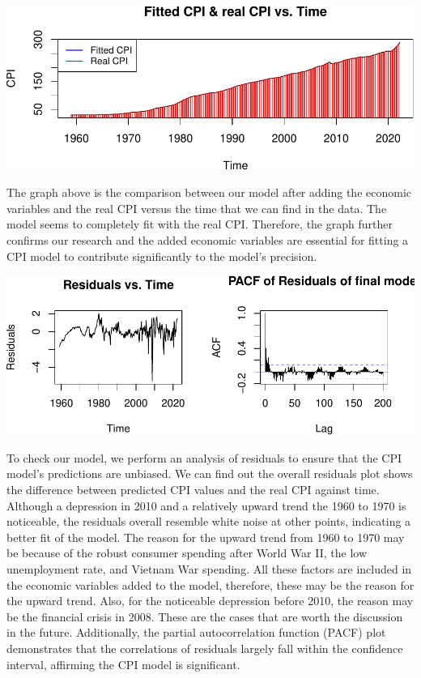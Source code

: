 \documentclass[
  man,floatsintext,
  man]{apa6}
\begin{document}
\includegraphics{stat429_group2_final_proj_files/figure-latex/unnamed-chunk-5-1.pdf}

The graph above is the comparison between our model after adding the economic variables and the real CPI versus the time that we can find in the data. The model seems to completely fit with the real CPI. Therefore, the graph further confirms our research and the added economic variables are essential for fitting a CPI model to contribute significantly to the model's precision.

\includegraphics{stat429_group2_final_proj_files/figure-latex/unnamed-chunk-6-1.pdf}

To check our model, we perform an analysis of residuals to ensure that the CPI model's predictions are unbiased. We can find out the overall residuals plot shows the difference between predicted CPI values and the real CPI against time. Although a depression in 2010 and a relatively upward trend the 1960 to 1970 is noticeable, the residuals overall resemble white noise at other points, indicating a better fit of the model.\autocite{inflation1960-1970} The reason for the upward trend from 1960 to 1970 may be because of the robust consumer spending after World War II, the low unemployment rate, and Vietnam War spending. All these factors are included in the economic variables added to the model, therefore, these may be the reason for the upward trend. Also, for the noticeable depression before 2010, the reason may be the financial crisis in 2008\autocite{financial_crisis}. These are the cases that are worth the discussion in the future. Additionally, the partial autocorrelation function (PACF) plot demonstrates that the correlations of residuals largely fall within the confidence interval, affirming the CPI model is significant.
\end{document}
